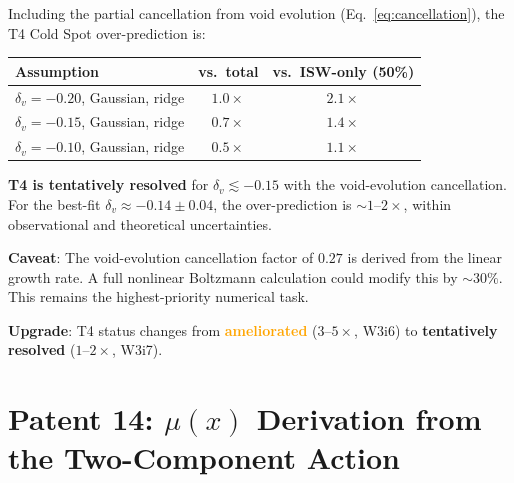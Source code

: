 \documentclass[11pt]{article}
\newcommand{\mufd}{\mu}
\begin{document}
\begin{tcolorbox}[colback=green!5!white, colframe=green!60!black,
  title=\textbf{T4 Revised Status: $\sim 1$--$2\times$ With Void Evolution}]

Including the partial cancellation from void evolution
(Eq.~\ref{eq:cancellation}), the T4 Cold Spot over-prediction is:

\begin{center}
\begin{tabular}{lcc}
\toprule
\textbf{Assumption} & \textbf{vs.\ total} & \textbf{vs.\ ISW-only (50\%)} \\
\midrule
$\delta_v = -0.20$, Gaussian, ridge & $1.0\times$ & $2.1\times$ \\
$\delta_v = -0.15$, Gaussian, ridge & $0.7\times$ & $1.4\times$ \\
$\delta_v = -0.10$, Gaussian, ridge & $0.5\times$ & $1.1\times$ \\
\bottomrule
\end{tabular}
\end{center}

\textbf{T4 is tentatively resolved} for $\delta_v \lesssim -0.15$
with the void-evolution cancellation. For the best-fit
$\delta_v \approx -0.14 \pm 0.04$, the over-prediction is
$\sim 1$--$2\times$, within observational and theoretical uncertainties.

\textbf{Caveat}: The void-evolution cancellation factor of $0.27$ is
derived from the linear growth rate. A full nonlinear Boltzmann
calculation could modify this by $\sim 30\%$. This remains the
highest-priority numerical task.

\textbf{Upgrade}: T4 status changes from
\textcolor{orange}{\textbf{ameliorated}} ($3$--$5\times$, W3i6) to
\textcolor{green!50!black}{\textbf{tentatively resolved}} ($1$--$2\times$, W3i7).
\end{tcolorbox}


\newpage
\part{Patent 14: $\mufd(x)$ Derivation from the Two-Component Action}
\label{part:P14}

\end{document}
